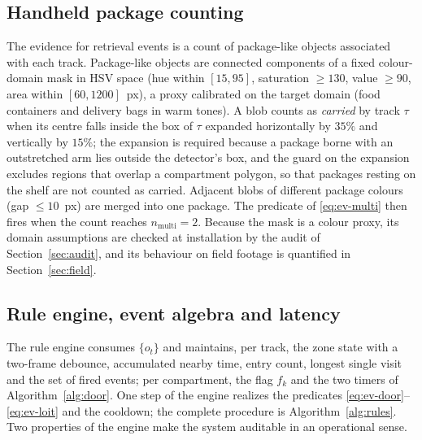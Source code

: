\documentclass[journal,article,submit,oneauthor]{Definitions/mdpi}
\begin{document}
\subsection{Handheld package counting}
\label{sec:packages}
The evidence for retrieval events is a count of package-like objects associated with each
track. Package-like objects are connected components of a fixed colour-domain mask in HSV
space (hue within $[15,95]$, saturation $\ge 130$, value $\ge 90$, area within
$[60,1200]$~px), a proxy calibrated on the target domain (food containers and delivery bags
in warm tones). A blob counts as \emph{carried} by track $\tau$ when its centre falls inside
the box of $\tau$ expanded horizontally by $35\%$ and vertically by $15\%$; the expansion is
required because a package borne with an outstretched arm lies outside the detector's box,
and the guard on the expansion excludes regions that overlap a compartment polygon, so that
packages resting on the shelf are not counted as carried. Adjacent blobs of different
package colours (gap $\le 10$~px) are merged into one package. The predicate of
\eqref{eq:ev-multi} then fires when the count reaches $n_{\mathrm{multi}}=2$. Because the
mask is a colour proxy, its domain assumptions are checked at installation by the audit of
Section~\ref{sec:audit}, and its behaviour on field footage is quantified in
Section~\ref{sec:field}.

\subsection{Rule engine, event algebra and latency}
\label{sec:rules}
The rule engine consumes $\{o_t\}$ and maintains, per track, the zone state with a two-frame
debounce, accumulated nearby time, entry count, longest single visit and the set of fired
events; per compartment, the flag $f_k$ and the two timers of Algorithm~\ref{alg:door}. One
step of the engine realizes the predicates \eqref{eq:ev-door}--\eqref{eq:ev-loit} and the
cooldown; the complete procedure is Algorithm~\ref{alg:rules}. Two properties of the engine
make the system auditable in an operational sense.
\end{document}
